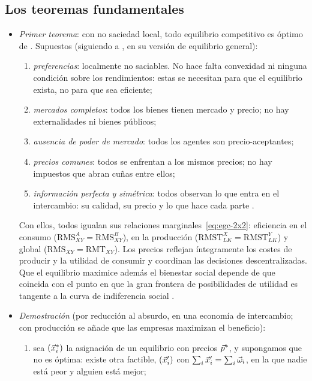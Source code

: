 \documentclass[11pt]{article}
\begin{document}
\subsection{Los teoremas fundamentales}\label{anexo:teoremas-fundamentales}

\begin{itemize}
\item \emph{Primer teorema}: con no saciedad local, todo equilibrio competitivo es óptimo de . Supuestos (siguiendo a \textcite[cap.~16]{MasColellWhinstonGreen1995}, en su versión de equilibrio general):
  \begin{enumerate}
  \item \emph{preferencias}: localmente no saciables. No hace falta convexidad ni ninguna condición sobre los rendimientos: estas se necesitan para que el equilibrio exista, no para que sea eficiente;
  \item \emph{mercados completos}: todos los bienes tienen mercado y precio; no hay externalidades ni bienes públicos;
  \item \emph{ausencia de poder de mercado}: todos los agentes son precio-aceptantes;
  \item \emph{precios comunes}: todos se enfrentan a los mismos precios; no hay impuestos que abran cuñas entre ellos;
  \item \emph{información perfecta y simétrica}: todos observan lo que entra en el intercambio: su calidad, su precio y lo que hace cada parte .
  \end{enumerate}
  Con ellos, todos igualan sus relaciones marginales~\eqref{eq:egc-2x2}: eficiencia en el consumo ($\mathrm{RMS}^A_{XY}=\mathrm{RMS}^B_{XY}$), en la producción ($\mathrm{RMST}^X_{LK}=\mathrm{RMST}^Y_{LK}$) y global ($\mathrm{RMS}_{XY}=\mathrm{RMT}_{XY}$). Los precios reflejan íntegramente los costes de producir y la utilidad de consumir y coordinan las decisiones descentralizadas. Que el equilibrio maximice además el bienestar social depende de que coincida con el punto en que la gran frontera de posibilidades de utilidad es tangente a la curva de indiferencia social .
\item \emph{Demostración} (por reducción al absurdo, en una economía de intercambio; con producción se añade que las empresas maximizan el beneficio)\nocite{MasColellWhinstonGreen1995}:
  \begin{enumerate}
  \item sea $(\vec{x}^*_i)$ la asignación de un equilibrio con precios $\vec{p}^*$, y supongamos que no es óptima: existe otra factible, $(\vec{x}'_i)$ con $\sum_i\vec{x}'_i=\sum_i\vec{\omega}_i$, en la que nadie está peor y alguien está mejor;

\end{enumerate}
\end{itemize}
\end{document}
